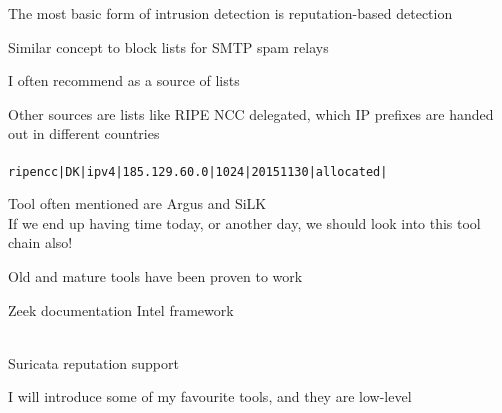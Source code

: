 \documentclass[Screen16to9,17pt]{foils}
\begin{document}


\begin{list2}
\item The most basic form of intrusion detection is reputation-based detection
\item Similar concept to block lists for SMTP spam relays
\item I often recommend  as a source of lists
\item Other sources are lists like RIPE NCC delegated, which IP prefixes are handed out in different countries\\
\\
\verb+ripencc|DK|ipv4|185.129.60.0|1024|20151130|allocated|+
\item Tool often mentioned are Argus and SiLK \\
If we end up having time today, or another day, we should look into this tool chain also!
\item Old and mature tools have been proven to work
\end{list2}



\begin{list1}
\item Zeek documentation Intel framework\\
\\
\item Suricata reputation support\\
\end{list1}






\begin{list2}
\item I will introduce some of my favourite tools, and they are low-level

\end{list2}


\end{document}
